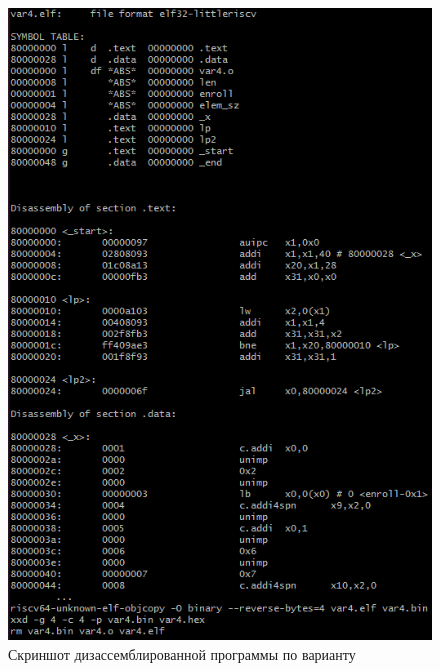 \begin{figure}[H]
	\begin{center}
		\includegraphics[scale=0.65]{img/var4disassembler.png}
	\end{center}
	\captionsetup{justification=centering}
	\caption{Скриншот дизассемблированной программы по варианту}
	\label{img:var4disassembler}
\end{figure}

